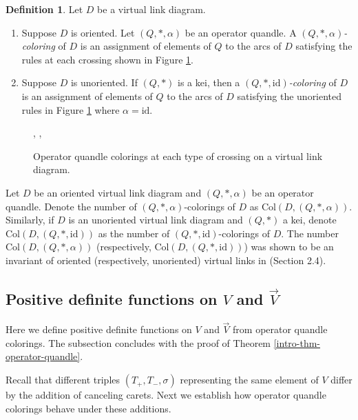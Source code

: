 \documentclass[11pt, twoside]{amsart}
\numberwithin{equation}{section}
\theoremstyle{definition}
\newtheorem{definition}[theorem]{Definition}
\numberwithin{equation}{section}
\begin{document}
\begin{definition}
    Let $D$ be a virtual link diagram. 
    \begin{enumerate}
        \item Suppose $D$ is oriented. Let $(Q,*,\alpha)$ be an operator quandle. A \textit{$(Q,*,\alpha)$-coloring} of $D$ is an assignment of elements of $Q$ to the arcs of $D$ satisfying the rules at each crossing shown in Figure \ref{fig: operator_quandle_colorings_crossings}.
        \item Suppose $D$ is unoriented. If $(Q,*)$ is a kei, then a $(Q,*,\text{id})$\textit{-coloring} of $D$ is an assignment of elements of $Q$ to the arcs of $D$ satisfying the unoriented rules in Figure \ref{fig: operator_quandle_colorings_crossings} where $\alpha=\text{id}$. 
    \end{enumerate}
\end{definition}

\begin{figure}[h!]
    \centering
    \operatorquandlecoloringpositive,  \operatorquandlecoloringnegative, \operatorquandlecoloringvirtual
    \caption{Operator quandle colorings at each type of crossing on a virtual link diagram.}
    \label{fig: operator_quandle_colorings_crossings}
\end{figure}

 Let $D$ be an oriented virtual link diagram and $(Q,*,\alpha)$ be an operator quandle.  Denote the number of $(Q,*,\alpha)$-colorings of $D$ as $\text{Col}(D, (Q, *, \alpha))$. Similarly, if $D$ is an unoriented virtual link diagram and $(Q,*)$ a kei, denote $\text{Col}(D,(Q,*,\text{id}))$ as the number of $(Q,*,\text{id})$-colorings of $D$. The number $\text{Col}(D, (Q, *, \alpha))$ (respectively, $\text{Col}(D,(Q,*,\text{id}))$) was shown to be an invariant of oriented (respectively, unoriented) virtual links in \cite{KM05} (Section 2.4).

\subsection{Positive definite functions on $V$ and $\vec{V}$} \label{sec_proof_of_C}
Here we define positive definite functions on $V$ and $\vec{V}$ from operator quandle colorings. The subsection concludes with the proof of Theorem \ref{intro-thm-operator-quandle}. 

Recall that different triples $(T_+,T_-,\sigma)$ representing the same element of $V$ differ by the addition of canceling carets. Next we establish how operator quandle colorings behave under these additions. 
\end{document}
